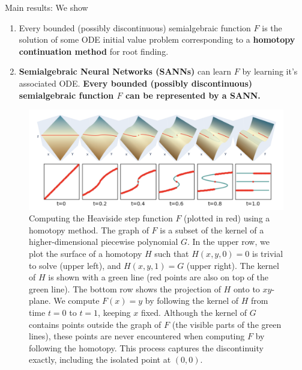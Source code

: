 \documentclass[final]{beamer}
\newlength{\mcolwidth}
\begin{document}
\begin{frame}[t]
\begin{columns}[t]
\begin{column}{\mcolwidth}
  \begin{alertblock}{Main results: We show}
    \begin{enumerate}
      \item Every bounded (possibly discontinuous) semialgebraic function $F$ is the solution of some ODE initial value problem corresponding to a \textbf{homotopy continuation method} for root finding.
      \item \textbf{Semialgebraic Neural Networks (SANNs)} can learn $F$ by learning it's associated ODE. \textbf{Every bounded (possibly discontinuous) semialgebraic function $F$ can be represented by a SANN.}
    \end{enumerate}
\end{alertblock}

  \begin{figure}
    \centering
    \includegraphics[width=\linewidth]{images/heaviside_homotopy.png}
    \caption{
      Computing the Heaviside step function $F$ (plotted in red) using a homotopy method. 
      The graph of $F$ is a subset of the kernel of a higher-dimensional piecewise polynomial $G$.
      In the upper row, we plot the surface of a homotopy $H$ such that $H(x,y,0)=0$ is trivial to solve (upper left), and $H(x,y,1)=G$ (upper right).
      The kernel of $H$ is shown with a green line (red points are also on top of the green line).
      The bottom row shows the projection of $H$ onto to $xy$-plane.
      We compute $F(x)=y$ by following the kernel of $H$ from time $t=0$ to $t=1$, keeping $x$ fixed.
      Although the kernel of $G$ contains points outside the graph of $F$ (the visible parts of the green lines), these points are never encountered when computing $F$ by following the homotopy.
      This process captures the discontinuity exactly, including the isolated point at $(0,0)$. 
    }
  \end{figure}


\end{column}
\end{columns}
\end{frame}
\end{document}
